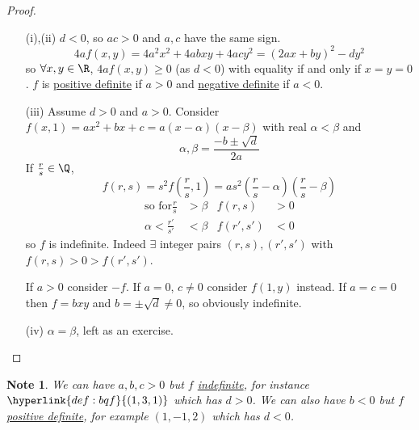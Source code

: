 \documentclass{article}
\newtheorem*{note}{Note}
\begin{document}
\begin{proof}\leavevmode
    \begin{enumerate}
        \item[(i),(ii)] $d < 0$, so $ac > 0$ and $a,c$ have the same sign.
            \begin{equation*}
                4a f(x, y) = 4 a^2 x^2 + 4 a b x y + 4 a c y^2 = (2ax+by)^2 - dy^2
            \end{equation*}
            so $\forall x, y \in \R$, $4a f(x, y) \geq 0$ (as $d < 0$) with equality if and only if $x = y = 0$.
            $f$ is \hyperlink{def:definite}{positive definite} if $a > 0$ and \hyperlink{def:definite}{negative definite} if $a < 0$.
        \item[(iii)] Assume $d > 0$ and $a > 0$.
        Consider $f(x, 1) = a x^2 + b x + c = a(x - \alpha)(x - \beta)$ with real $\alpha < \beta$ and
        \begin{equation*}
            \alpha, \beta = \frac{-b \pm \sqrt{d}}{2a}
        \end{equation*}
        If $\frac{r}{s} \in \Q$,
        \begin{equation*}
            f(r, s) = s^2 f\left(\frac{r}{s}, 1\right) = a s^2 \left(\frac{r}{s} - \alpha\right)\left(\frac{r}{s} - \beta\right)
        \end{equation*}
        \begin{align*}
            \text{so for} \frac{r}{s} &> \beta & f(r, s) &> 0 \\
            \alpha < \frac{r'}{s'} &< \beta & f(r', s') &< 0
        \end{align*}
        so $f$ is indefinite.
        Indeed $\exists$ integer pairs $(r, s), (r', s')$ with $f(r, s) > 0 > f(r', s')$.

        If $a > 0$ consider $-f$. If $a = 0$, $c \neq 0$ consider $f(1, y)$ instead.
        If $a=c=0$ then $f = b xy$ and $b = \pm \sqrt{d} \neq 0$, so obviously indefinite.
    \item[(iv)] $\alpha = \beta$, left as an exercise. \qedhere
    \end{enumerate}
\end{proof}

\begin{note}
    We can have $a, b, c > 0$ but $f$ \hyperlink{def:definite}{indefinite}, for instance $\hyperlink{def:bqf}{(1, 3, 1)}$ which has $d > 0$.
    We can also have $b < 0$ but $f$ \hyperlink{def:definite}{positive definite}, for example $(1, -1, 2)$ which has $d < 0$.
\end{note}
\end{document}

